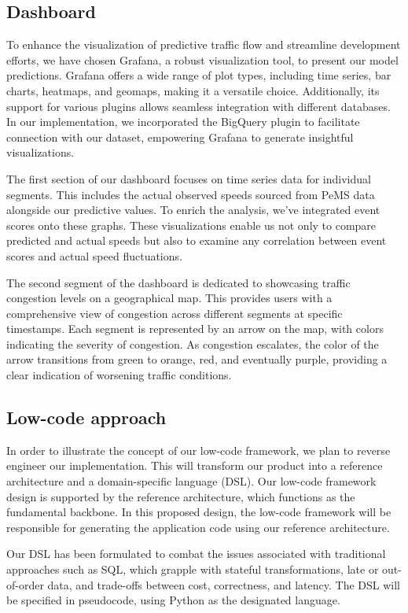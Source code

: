 \subsection{Dashboard}
 To enhance the visualization of predictive traffic flow and streamline development efforts, we have chosen Grafana, a robust visualization tool, to present our model predictions. Grafana offers a wide range of plot types, including time series, bar charts, heatmaps, and geomaps, making it a versatile choice. Additionally, its support for various plugins allows seamless integration with different databases. In our implementation, we incorporated the BigQuery plugin to facilitate connection with our dataset, empowering Grafana to generate insightful visualizations.

The first section of our dashboard focuses on time series data for individual segments. This includes the actual observed speeds sourced from PeMS data alongside our predictive values. To enrich the analysis, we've integrated event scores onto these graphs. These visualizations enable us not only to compare predicted and actual speeds but also to examine any correlation between event scores and actual speed fluctuations.

The second segment of the dashboard is dedicated to showcasing traffic congestion levels on a geographical map. This provides users with a comprehensive view of congestion across different segments at specific timestamps. Each segment is represented by an arrow on the map, with colors indicating the severity of congestion. As congestion escalates, the color of the arrow transitions from green to orange, red, and eventually purple, providing a clear indication of worsening traffic conditions.
 

\subsection{Low-code approach}
 In order to illustrate the concept of our low-code framework, we plan to reverse engineer our implementation. This will transform our product into a reference architecture and a domain-specific language (DSL). Our low-code framework design is supported by the reference architecture, which functions as the fundamental backbone. In this proposed design, the low-code framework will be responsible for generating the application code using our reference architecture. 

Our DSL has been formulated to combat the issues associated with traditional approaches such as SQL, which grapple with stateful transformations, late or out-of-order data, and trade-offs between cost, correctness, and latency. The DSL will be specified in pseudocode, using Python as the designated language. 

